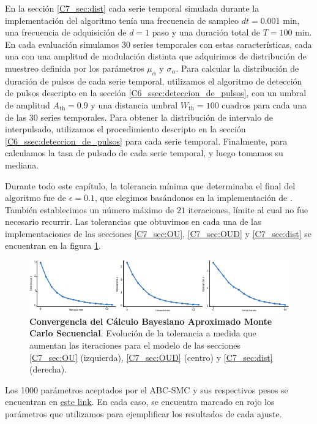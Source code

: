 \documentclass[./main.tex]{subfiles}
\begin{document}
\begin{subappendices}
En la sección \ref{C7_sec:dist} cada serie temporal simulada durante la implementación del algoritmo tenía una frecuencia de sampleo $dt = 0.001 \text{ min}$, una frecuencia de adquisición de $d = 1$ paso y una duración total de $T = 100 \text{ min}$. En cada evaluación simulamos $30$ series temporales con estas características, cada una con una amplitud de modulación distinta que adquirimos de distribución de muestreo definida por los parámetros $\mu_{\alpha}$ y $\sigma_{\alpha}$. Para calcular la distribución de duración de pulsos de cada serie temporal, utilizamos el algoritmo de detección de pulsos descripto en la sección \ref{C6_ssec:deteccion_de_pulsos}, con un umbral de amplitud $A_{\text{th}} = 0.9$ y una distancia umbral $W_{\text{th}} = 100 \text{ cuadros}$ para cada una de las 30 series temporales.  Para obtener la distribución de intervalo de interpulsado,  utilizamos el procedimiento descripto en la sección \ref{C6_ssec:deteccion_de_pulsos} para cada serie temporal. Finalmente, para calculamos la tasa de pulsado de cada serie temporal, y luego tomamos su mediana. 


Durante todo este capítulo, la tolerancia mínima que determinaba el final del algoritmo fue de $\epsilon = 0.1$, que elegimos basándonos en la implementación de \cite{Costa2021}. También establecimos un número máximo de $21$ iteraciones, límite al cual no fue necesario recurrir. Las tolerancias que obtuvimos en cada una de las implementaciones de las secciones  \ref{C7_sec:OU}, \ref{C7_sec:OUD} y \ref{C7_sec:dist} se encuentran en la figura 
\ref{C7_fig:ap_eps}.

\begin{figure}
    \centering
    \includegraphics[width=1\columnwidth]{figures/chapter7/C7_eps.pdf} 
    \caption{\textbf{Convergencia del Cálculo Bayesiano Aproximado Monte Carlo Secuencial}. Evolución de la tolerancia a medida que aumentan las iteraciones para el modelo de las secciones \ref{C7_sec:OU} (izquierda),  \ref{C7_sec:OUD} (centro) y  \ref{C7_sec:dist} (derecha).}
    \label{C7_fig:ap_eps}
\end{figure} 


Los 1000 parámetros aceptados por el ABC-SMC y sus respectivos pesos se encuentran en \href{https://github.com/fiorefabris/parameters}{ \underline{este link}}. En cada caso, se encuentra marcado en rojo los parámetros que utilizamos para ejemplificar los resultados de cada ajuste.


\end{subappendices}
\end{document}
